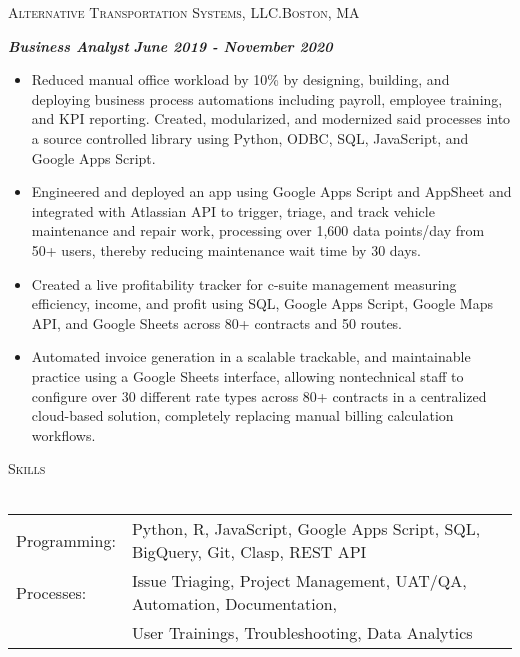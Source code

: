 \documentclass[a4paper]{article}
\newcommand{\lineunder} {
    \vspace*{-8pt} \\
    \hspace*{-18pt} \hrulefill \\
}
\newcommand{\header} [1] {
    {\hspace*{-18pt}\vspace*{6pt} \textsc{#1}}
    \vspace*{-6pt} \lineunder
}
\newcommand{\jobtitle} [1] {
    {\hspace*{-18pt} \textsc{#1}}
    
}
\begin{document}
\jobtitle{Alternative Transportation Systems, LLC.\hfill Boston, MA}
\hspace*{-16pt}\textit{\textbf{Business Analyst}} \hfill \textbf{\textit{June 2019 - November 2020}}\\
\vspace{-1mm}
\begin{itemize}[leftmargin=10pt,align=left] \itemsep 1pt
	\item Reduced manual office workload by 10\% by designing, building, and deploying business process automations including payroll, employee training, and KPI reporting.
    Created, modularized, and modernized said processes into a source controlled library using Python, ODBC, SQL, JavaScript, and Google Apps Script.
	\item Engineered and deployed an app using Google Apps Script and AppSheet and integrated with Atlassian API to trigger, triage, and track vehicle maintenance and repair work, processing over 1,600 data points/day from 50+ users, thereby reducing maintenance wait time by 30 days.
	\item Created a live profitability tracker for c-suite management measuring efficiency, income, and profit using SQL, Google Apps Script, Google Maps API, and Google Sheets across 80+ contracts and 50 routes.
	\item Automated invoice generation in a scalable trackable, and maintainable practice using a Google Sheets interface, allowing nontechnical staff to configure over 30 different rate types across 80+ contracts in a centralized cloud-based solution, completely replacing manual billing calculation workflows.
\end{itemize}

\header{Skills}
\begin{tabular}[leftmargin=-10pt,align=left]{ l l }
	\hspace*{-16pt}Programming:    &   Python, R, JavaScript, Google Apps Script, SQL, BigQuery, Git, Clasp, REST API\\
    \hspace*{-16pt}Processes:      &   Issue Triaging, Project Management, UAT/QA, Automation, Documentation,\\ 
                    &   User Trainings, Troubleshooting, Data Analytics
\end{tabular}
\vspace{2mm}
\end{document}
